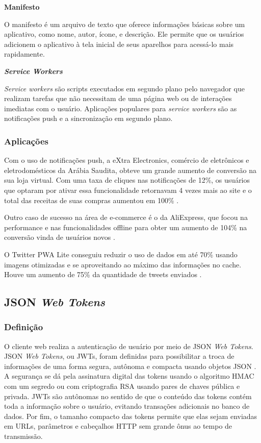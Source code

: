 \begin{description}

\item \textbf{Manifesto}

O manifesto é um arquivo de texto que oferece informações básicas sobre um aplicativo, como nome, autor, ícone, e descrição. Ele permite que os usuários adicionem o aplicativo à tela inicial de seus aparelhos para acessá-lo mais rapidamente.

\item \textbf{\textit{Service Workers}}

\textit{Service workers} são scripts executados em segundo plano pelo navegador que realizam tarefas que não necessitam de uma página web ou de interações imediatas com o usuário. Aplicações populares para \textit{service workers} são as notificações push e a sincronização em segundo plano.

\end{description}

\subsubsection{Aplicações}
Com o uso de notificações push, a eXtra Electronics, comércio de eletrônicos e eletrodomésticos da Arábia Saudita, obteve um grande aumento de conversão na sua loja virtual. Com uma taxa de cliques nas notificações de 12\%, os usuários que optaram por ativar essa funcionalidade retornavam 4 vezes mais ao site e o total das receitas de suas compras aumentou em 100\% \cite{googledevextra}.

Outro caso de sucesso na área de e-commerce é o da AliExpress, que focou na performance e nas funcionalidades offline para obter um aumento de 104\% na conversão vinda de usuários novos \cite{googledevaliexpress}.

O Twitter PWA Lite conseguiu reduzir o uso de dados em até 70\% usando imagens otimizadas e se aproveitando ao máximo das informações no cache. Houve um aumento de 75\% da quantidade de tweets enviados \cite{googledevtwitter}.

\subsection{JSON \textit{Web Tokens}}

\subsubsection{Definição}
O cliente web realiza a autenticação de usuário por meio de JSON \textit{Web Tokens}. JSON \textit{Web Tokens}, ou JWTs, foram definidas para possibilitar a troca de informações de uma forma segura, autônoma e compacta usando objetos JSON \cite{rfc7519}. A segurança se dá pela assinatura digital das tokens usando o algoritmo HMAC com um segredo ou com criptografia RSA usando pares de chaves pública e privada. JWTs são autônomas no sentido de que o conteúdo das tokens contém toda a informação sobre o usuário, evitando transações adicionais no banco de dados. Por fim, o tamanho compacto das tokens permite que elas sejam enviadas em URLs, parâmetros e cabeçalhos HTTP sem grande ônus ao tempo de transmissão.

